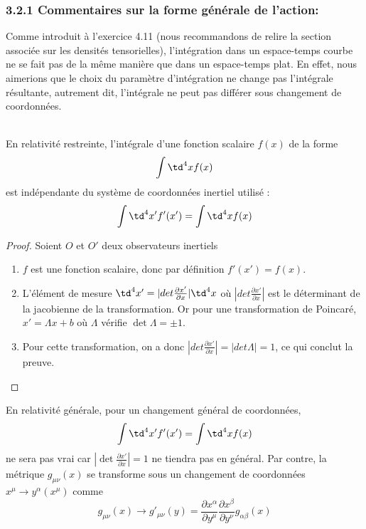 \subsubsection{3.2.1 Commentaires sur la forme générale de l'action:}
Comme introduit à l'exercice 4.11 (nous recommandons de relire la section associée sur les densités tensorielles), l'intégration dans un espace-temps courbe ne se fait pas de la même manière que dans un espace-temps plat. En effet, nous aimerions que le choix du paramètre d'intégration ne change pas l'intégrale résultante, autrement dit, l'intégrale ne peut pas différer sous changement de coordonnées.\\
\\
\begin{theoremframe}
    \begin{propri}
        En relativité restreinte, l'intégrale d'une fonction scalaire $f(x)$ de la forme $$\int \td ^4x f(x)$$ est indépendante du système de coordonnées inertiel utilisé : $$\int \td ^4x' f'(x') = \int \td ^4x f(x)$$
    \end{propri}
\end{theoremframe}
\begin{proof}
    Soient $O$ et $O'$ deux observateurs inertiels
    \begin{enumerate}
        \item $f$ est une fonction scalaire, donc par définition $f'(x') = f(x)$.
        \item L'élément de mesure $\td ^4x' = |det \frac{\partial x'}{\partial x}|\td ^4x$ où $|det \frac{\partial x'}{\partial x}|$ est le déterminant de la jacobienne de la transformation. Or pour une transformation de Poincaré, $x' = \Lambda x + b$ où $\Lambda$ vérifie $\det \Lambda = \pm 1$. 
        \item Pour cette transformation, on a donc $|det \frac{\partial x'}{\partial x}| = |det \Lambda| = 1$, ce qui conclut la preuve.
\end{enumerate}
\end{proof}
En relativité générale, pour un changement général de coordonnées,
\begin{equation}
    \int \td ^4x' f'(x') = \int \td ^4x f(x)
\end{equation}
ne sera pas vrai car  $|\det \frac{\partial x'}{\partial x}| = 1$ ne tiendra pas en général. Par contre, la métrique $g_{\mu \nu}(x)$ se transforme sous un changement de coordonnées $x^{\mu} \rightarrow y^{\alpha}(x^{\mu})$ comme
\begin{equation}
    g_{\mu \nu}(x) \rightarrow g'_{\mu \nu}(y) = \frac{\partial x^{\alpha}}{\partial y^{\mu}}\frac{\partial x^{\beta}}{\partial y^{\nu}}g_{\alpha \beta}(x)
\end{equation}
